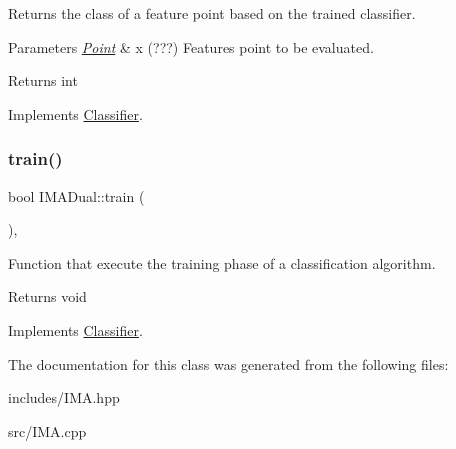 Returns the class of a feature point based on the trained classifier. 


\begin{DoxyParams}{Parameters}
{\em \hyperlink{class_point}{Point}} & x (???) Features point to be evaluated. \\
\hline
\end{DoxyParams}
\begin{DoxyReturn}{Returns}
int 
\end{DoxyReturn}


Implements \hyperlink{class_classifier_ae8e9554823b85ddc2dcad2955da811d9}{Classifier}.

\mbox{\label{class_i_m_a_dual_aad4b4f97645da661c954259e52c424b4}} 
\subsubsection{\texorpdfstring{train()}{train()}}
{\footnotesize\ttfamily bool I\+M\+A\+Dual\+::train (\begin{DoxyParamCaption}{ }\end{DoxyParamCaption})\hspace{0.3cm}{\ttfamily [override]}, {\ttfamily [virtual]}}



Function that execute the training phase of a classification algorithm. 

\begin{DoxyReturn}{Returns}
void 
\end{DoxyReturn}


Implements \hyperlink{class_classifier_a2306a5de27555ab093593ac9642bc7d9}{Classifier}.



The documentation for this class was generated from the following files\+:\begin{DoxyCompactItemize}
\item 
includes/I\+M\+A.\+hpp\item 
src/I\+M\+A.\+cpp\end{DoxyCompactItemize}
